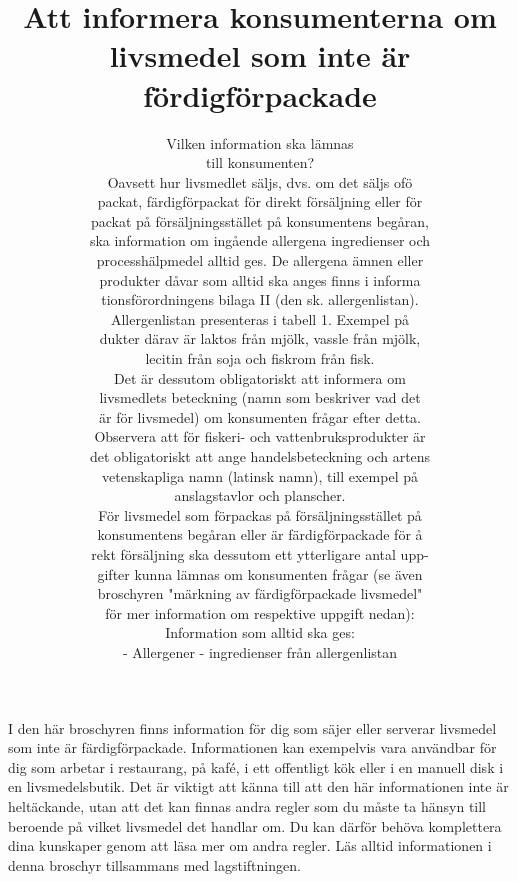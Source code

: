 \title{
Att informera konsumenterna om livsmedel som inte är fördigförpackade
}
\author{
Vilken information ska lämnas \\ till konsumenten? \\ Oavsett hur livsmedlet säljs, dvs. om det säljs ofö \\ packat, färdigförpackat för direkt försäljning eller för \\ packat på försäljningsstället på konsumentens begåran, \\ ska information om ingående allergena ingredienser och \\ processhälpmedel alltid ges. De allergena ämnen eller \\ produkter dåvar som alltid ska anges finns i informa \\ tionsförordningens bilaga II (den sk. allergenlistan). \\ Allergenlistan presenteras i tabell 1. Exempel på \\ dukter därav är laktos från mjölk, vassle från mjölk, \\ lecitin från soja och fiskrom från fisk. \\ Det är dessutom obligatoriskt att informera om \\ livsmedlets beteckning (namn som beskriver vad det \\ är för livsmedel) om konsumenten frågar efter detta. \\ Observera att för fiskeri- och vattenbruksprodukter är \\ det obligatoriskt att ange handelsbeteckning och artens \\ vetenskapliga namn (latinsk namn), till exempel på \\ anslagstavlor och planscher. \\ För livsmedel som förpackas på försäljningsstället på \\ konsumentens begåran eller är färdigförpackade för å \\ rekt försäljning ska dessutom ett ytterligare antal upp- \\ gifter kunna lämnas om konsumenten frågar (se även \\ broschyren "märkning av färdigförpackade livsmedel" \\ för mer information om respektive uppgift nedan): \\ Information som alltid ska ges: \\ - Allergener - ingredienser från allergenlistan
}

I den här broschyren finns information för dig som säjer eller serverar livsmedel som inte är färdigförpackade. Informationen kan exempelvis vara användbar för dig som arbetar i restaurang, på kafé, i ett offentligt kök eller i en manuell disk i en livsmedelsbutik. Det är viktigt att känna till att den här informationen inte är heltäckande, utan att det kan finnas andra regler som du måste ta hänsyn till beroende på vilket livsmedel det handlar om.
Du kan därför behöva komplettera dina kunskaper genom att läsa mer om andra regler. Läs alltid informationen i denna broschyr tillsammans med lagstiftningen.
